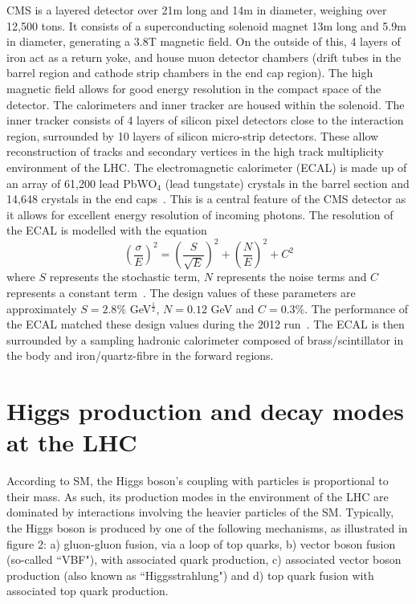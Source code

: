 \documentclass[10pt]{article}
\begin{document}
CMS is a layered detector over 21m long and 14m in diameter, weighing over 12,500 tons. It consists of a superconducting solenoid magnet 13m long and 5.9m in diameter, generating a 3.8T magnetic field. On the outside of this, 4 layers of iron act as a return yoke, and house muon detector chambers (drift tubes in the barrel region and cathode strip chambers in the end cap region). The high magnetic field allows for good energy resolution in the compact space of the detector. The calorimeters and inner tracker are housed within the solenoid. The inner tracker consists of 4 layers of silicon pixel detectors close to the interaction region, surrounded by 10 layers of silicon micro-strip detectors. These allow reconstruction of tracks and secondary vertices in the high track multiplicity environment of the LHC. The electromagnetic calorimeter (ECAL) is made up of an array of 61,200 lead PbWO$_4$ (lead tungstate) crystals in the barrel section and 14,648 crystals in the end caps~\cite{CMSTDR}. This is a central feature of the CMS detector as it allows for excellent energy resolution of incoming photons. The resolution of the ECAL is modelled with the equation \begin{equation} \left( \frac{\sigma}{E}\right) ^2= \left( \frac{S}{\sqrt{E}} \right)^2 + \left( \frac{N}{E} \right)^2 + C^2\end{equation} where $S$ represents the stochastic term, $N$ represents the noise terms and $C$ represents a constant term~\cite{CMSDesign}. The design values of these parameters are approximately $S=2.8\%$ GeV$^\frac{1}{2}$, $ N= 0.12$ GeV and $C=0.3 \%$. The performance of the ECAL matched these design values during the 2012 run~\cite{ECAL2012}. The ECAL is then surrounded by a sampling hadronic calorimeter composed of brass/scintillator in the body and iron/quartz-fibre in the forward regions. 


\section{Higgs production and decay modes at the LHC}

According to SM, the Higgs boson's coupling with particles is proportional to their mass. As such, its production modes in the environment of the LHC are dominated by interactions involving the heavier particles of the SM. Typically, the Higgs boson is produced by one of the following mechanisms, as illustrated in figure 2: a) gluon-gluon fusion, via a loop of top quarks, b) vector boson fusion (so-called “VBF"), with associated quark production, c) associated vector boson production (also known as “Higgsstrahlung") and d) top quark fusion with associated top quark production.
\end{document}
